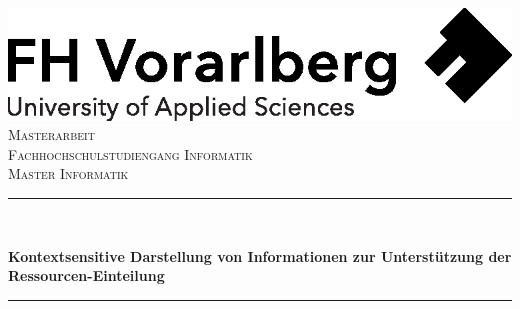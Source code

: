 
\begin{titlepage}




\begin{center}


\newcommand{\HRule}{\rule{\linewidth}{0.5mm}}
\includegraphics[width = 0.5 \textwidth]{img/FHVlogo}
\\[1.5cm]
\textsc{Masterarbeit\\Fachhochschulstudiengang Informatik\\Master Informatik} \\[1.5cm]
\HRule \\[0.4cm]

{ \huge \bfseries Kontextsensitive Darstellung von Informationen zur Unterstützung der Ressourcen-Einteilung}\\ [0.4cm]%
\HRule \\[1cm]

\end{center}
\end{titlepage}
